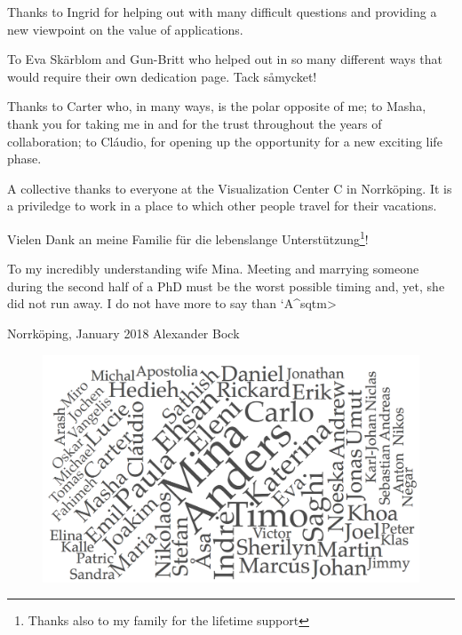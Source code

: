 Thanks to Ingrid for helping out with many difficult questions and providing a new viewpoint on the value of applications.

To Eva Sk\"arblom and Gun-Britt who helped out in so many different ways that would require their own dedication page.  Tack s\aa mycket!

Thanks to Carter who, in many ways, is the polar opposite of me;  to Masha, thank you for taking me in and for the trust throughout the years of collaboration;  to Cl\'audio, for opening up the opportunity for a new exciting life phase.

A collective thanks to everyone at the Visualization Center C in Norrk\"oping.  It is a priviledge to work in a place to which other people travel for their vacations.

Vielen Dank an meine Familie f\"ur die lebenslange Unterst\"utzung\footnote{Thanks also to my family for the lifetime support}!

To my incredibly understanding wife Mina.  Meeting and marrying someone during the second half of a PhD must be the worst possible timing and, yet, she did not run away.  I do not have more to say than \<`A^sqtm>

\vspace{1cm}
\hrulefill
\hrulefill

Norrk\"oping, January 2018 \hfill Alexander Bock

\vfill

\begin{figure}[hb]
\centering
\includegraphics[width=0.75\linewidth]{figures/misc/wordcloud.png}
\end{figure}


